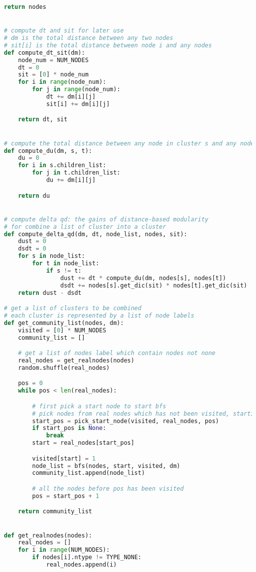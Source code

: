 \begin{lstlisting}[language={python}, caption={DSHRINK算法}, label=code:dshrink]
    return nodes


# compute dt and sit for later use
# dm is the total distance between any two nodes
# sit[i] is the total distance between node i and any nodes
def compute_dt_sit(dm):
    node_num = NUM_NODES
    dt = 0
    sit = [0] * node_num
    for i in range(node_num):
        for j in range(node_num):
            dt += dm[i][j]
            sit[i] += dm[i][j]

    return dt, sit


# compute the total distance between any node in cluster s and any node in cluster t
def compute_du(dm, s, t):
    du = 0
    for i in s.children_list:
        for j in t.children_list:
            du += dm[i][j]

    return du


# compute delta qd: the gains of distance-based modularity
# for combine a list of cluster into a cluster
def compute_delta_qd(dm, dt, node_list, nodes, sit):
    dust = 0
    dsdt = 0
    for s in node_list:
        for t in node_list:
            if s != t:
                dust += dt * compute_du(dm, nodes[s], nodes[t])
                dsdt += nodes[s].get_dic(sit) * nodes[t].get_dic(sit)
    return dust - dsdt

# get a list of clusters to be combined
# each cluster is represented by a list of node labels
def get_community_list(nodes, dm):
    visited = [0] * NUM_NODES
    community_list = []

    # get a list of nodes label which contain nodes not none
    real_nodes = get_realnodes(nodes)
    random.shuffle(real_nodes)

    pos = 0
    while pos < len(real_nodes):

        # first pick a start node to start bfs
        # pick nodes from real nodes which has not been visited, starting from pos
        start_pos = pick_start_node(visited, real_nodes, pos)
        if start_pos is None:
            break
        start = real_nodes[start_pos]

        visited[start] = 1
        node_list = bfs(nodes, start, visited, dm)
        community_list.append(node_list)

        # all the nodes before pos has been visited
        pos = start_pos + 1

    return community_list


def get_realnodes(nodes):
    real_nodes = []
    for i in range(NUM_NODES):
        if nodes[i].ntype != TYPE_NONE:
            real_nodes.append(i)


\end{lstlisting}
